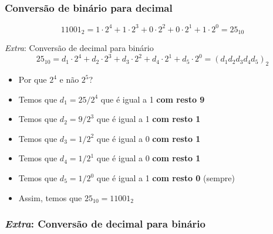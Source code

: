 \begin{frame}[c]
    \frametitle{Conversão de binário para decimal}
    \[
        11001_{2}  = 1 \cdot 2^4 + 1 \cdot 2^3 + 0 \cdot 2^2 + 0 \cdot 2^1 + 1 \cdot 2^0 =25_{10}
    \]
\end{frame}

\begin{frame}{\textit{Extra}: Conversão de decimal para binário}
    \[
        25_{10} = d_1 \cdot 2^4 + d_2 \cdot 2^3 + d_3 \cdot 2^2 + d_4 \cdot 2^1 + d_5 \cdot 2^0 = 
        (d_1 d_2 d_3 d_4 d_5)_{2}
    \]
    \begin{itemize}
        \item Por que \(2^4\) e não \(2^5\)?
        \item Temos que \(d_1 = 25 / 2^4 \) que é igual a 1 \textbf{com resto 9}
        \item Temos que \(d_2 = 9 / 2^3\) que é igual a 1 \textbf{com resto 1}
        \item Temos que \(d_3 = 1 / 2^2\) que é igual a 0 \textbf{com resto 1}
        \item Temos que \(d_4 = 1 / 2^1\) que é igual a 0 \textbf{com resto 1}
        \item Temos que \(d_5 = 1 / 2^0\) que é igual a 1 \textbf{com resto 0} (sempre)
        \item Assim, temos que \(25_{10} = 11001_{2}\)
    \end{itemize}
\end{frame}

\begin{frame}[c]
    \frametitle{\textit{Extra}: Conversão de decimal para binário}
    \begin{center}

    \end{center}
\end{frame}

